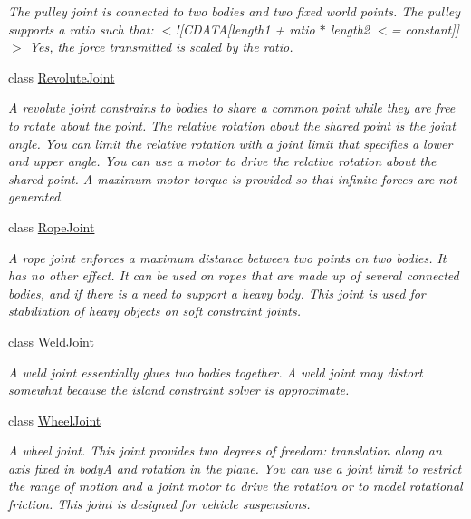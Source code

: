\begin{DoxyCompactItemize}
\begin{DoxyCompactList}\small\item\em The pulley joint is connected to two bodies and two fixed world points. The pulley supports a ratio such that\+: $<$!\mbox{[}C\+D\+A\+T\+A\mbox{[}length1 + ratio $\ast$ length2 $<$= constant\mbox{]}\mbox{]}$>$ Yes, the force transmitted is scaled by the ratio. \end{DoxyCompactList}\item 
class \hyperlink{class_farseer_physics_1_1_dynamics_1_1_joints_1_1_revolute_joint}{Revolute\+Joint}
\begin{DoxyCompactList}\small\item\em A revolute joint constrains to bodies to share a common point while they are free to rotate about the point. The relative rotation about the shared point is the joint angle. You can limit the relative rotation with a joint limit that specifies a lower and upper angle. You can use a motor to drive the relative rotation about the shared point. A maximum motor torque is provided so that infinite forces are not generated. \end{DoxyCompactList}\item 
class \hyperlink{class_farseer_physics_1_1_dynamics_1_1_joints_1_1_rope_joint}{Rope\+Joint}
\begin{DoxyCompactList}\small\item\em A rope joint enforces a maximum distance between two points on two bodies. It has no other effect. It can be used on ropes that are made up of several connected bodies, and if there is a need to support a heavy body. This joint is used for stabiliation of heavy objects on soft constraint joints. \end{DoxyCompactList}\item 
class \hyperlink{class_farseer_physics_1_1_dynamics_1_1_joints_1_1_weld_joint}{Weld\+Joint}
\begin{DoxyCompactList}\small\item\em A weld joint essentially glues two bodies together. A weld joint may distort somewhat because the island constraint solver is approximate. \end{DoxyCompactList}\item 
class \hyperlink{class_farseer_physics_1_1_dynamics_1_1_joints_1_1_wheel_joint}{Wheel\+Joint}
\begin{DoxyCompactList}\small\item\em A wheel joint. This joint provides two degrees of freedom\+: translation along an axis fixed in body\+A and rotation in the plane. You can use a joint limit to restrict the range of motion and a joint motor to drive the rotation or to model rotational friction. This joint is designed for vehicle suspensions. \end{DoxyCompactList}\end{DoxyCompactItemize}
